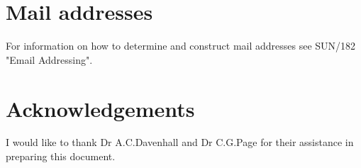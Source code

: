\section{Mail addresses}

For information on how to determine and construct mail addresses 
see SUN/182 "Email Addressing".

\section{Acknowledgements}
 
I would like to thank Dr A.C.Davenhall and Dr C.G.Page for their assistance
in preparing this document.


